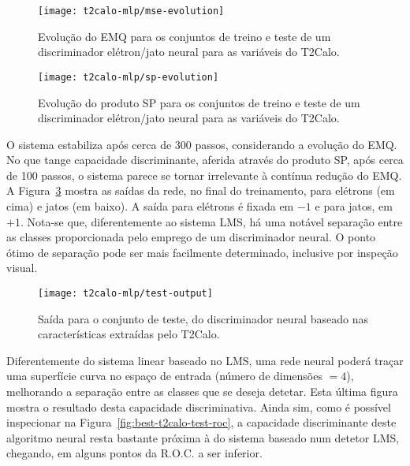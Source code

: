 \begin{figure}
\begin{center}
\texttt{[image: t2calo-mlp/mse-evolution]}
\end{center}
\caption{Evolução do EMQ para os conjuntos de treino e teste de um
discriminador elétron/jato neural para as variáveis do T2Calo.}
\label{fig:best-t2calo-mlp-mse}
\end{figure}

\begin{figure}
\begin{center}
\texttt{[image: t2calo-mlp/sp-evolution]}
\end{center}
\caption{Evolução do produto SP para os conjuntos de treino e teste de um
discriminador elétron/jato neural para as variáveis do T2Calo.}
\label{fig:best-t2calo-mlp-sp}
\end{figure}

O sistema estabiliza após cerca de 300 passos, considerando a evolução do
EMQ. No que tange capacidade discriminante, aferida através do produto SP,
após cerca de 100 passos, o sistema parece se tornar irrelevante à contínua
redução do EMQ. A Figura~\ref{fig:best-t2calo-mlp-output} mostra as saídas da
rede, no final do treinamento, para elétrons (em cima) e jatos (em baixo). A
saída para elétrons é fixada em $-1$ e para jatos, em $+1$. Nota-se que,
diferentemente ao sistema LMS, há uma notável separação entre as classes
proporcionada pelo emprego de um discriminador neural. O ponto ótimo de
separação pode ser mais facilmente determinado, inclusive por inspeção
visual. 

\begin{figure}
\begin{center}
\texttt{[image: t2calo-mlp/test-output]}
\end{center}
\caption{Saída para o conjunto de teste, do discriminador neural baseado nas
características extraídas pelo T2Calo.}
\label{fig:best-t2calo-mlp-output}
\end{figure}

Diferentemente do sistema linear baseado no LMS, uma rede neural poderá traçar
uma superfície curva no espaço de entrada (número de dimensões $=4$),
melhorando a separação entre as classes que se deseja detetar. Esta última
figura mostra o resultado desta capacidade discriminativa. Ainda sim, como é
possível inspecionar na Figura~\ref{fig:best-t2calo-test-roc}, a capacidade
discriminante deste algoritmo neural resta bastante próxima à do sistema
baseado num detetor LMS, chegando, em alguns pontos da R.O.C. a ser inferior.

